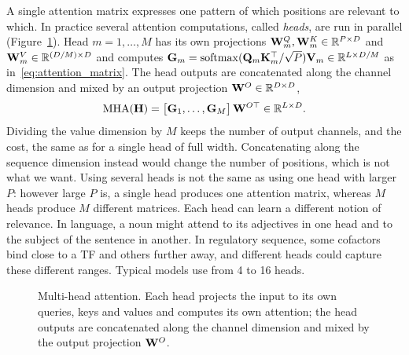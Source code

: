 A single attention matrix expresses one pattern of which positions are relevant to which. In practice several attention computations, called \emph{heads}, are run in parallel (Figure~\ref{fig:multihead}). Head $m=1,\dots,M$ has its own projections $\mathbf{W}^Q_m,\mathbf{W}^K_m\in\mathbb{R}^{P\times D}$ and $\mathbf{W}^V_m\in\mathbb{R}^{(D/M)\times D}$ and computes $\mathbf{G}_m=\operatorname{softmax}(\mathbf{Q}_m\mathbf{K}_m^\top/\sqrt{P})\mathbf{V}_m\in\mathbb{R}^{L\times D/M}$ as in~\eqref{eq:attention_matrix}. The head outputs are concatenated along the channel dimension and mixed by an output projection $\mathbf{W}^O\in\mathbb{R}^{D\times D}$,
\begin{equation}
  \operatorname{MHA}(\mathbf{H}) = \big[\mathbf{G}_1,\dots,\mathbf{G}_M\big]\,\mathbf{W}^{O\top} \in\mathbb{R}^{L\times D} .
\end{equation}
Dividing the value dimension by $M$ keeps the number of output channels, and the cost, the same as for a single head of full width. Concatenating along the sequence dimension instead would change the number of positions, which is not what we want. Using several heads is not the same as using one head with larger $P$: however large $P$ is, a single head produces one attention matrix, whereas $M$ heads produce $M$ different matrices. Each head can learn a different notion of relevance. In language, a noun might attend to its adjectives in one head and to the subject of the sentence in another. In regulatory sequence, some cofactors bind close to a TF and others further away, and different heads could capture these different ranges. Typical models use from 4 to 16 heads.

\begin{figure}[t]
  \centering
  \caption{Multi-head attention. Each head projects the input to its own queries, keys and values and computes its own attention; the head outputs are concatenated along the channel dimension and mixed by the output projection $\mathbf{W}^O$.}
  \label{fig:multihead}
\end{figure}

